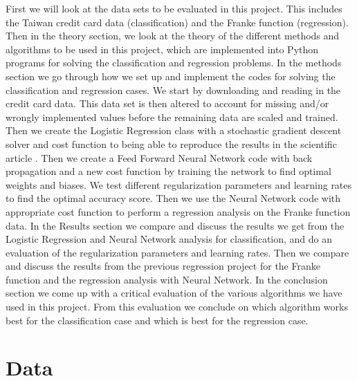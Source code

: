 \documentclass[12pt,a4paper,english]{article}
\begin{document}
First we will look at the data sets to be evaluated in this project. This includes the Taiwan credit card data (classification) and the Franke function (regression). Then in the theory section, we look at the theory of the different methods and algorithms to be used in this project, which are implemented into Python programs for solving the classification and regression problems. In the methods section we go through how we set up and implement the codes for solving the classification and regression cases. We start by downloading and reading in the credit card data. This data set is then altered to account for missing and/or wrongly implemented values before the remaining data are scaled and trained. Then we create the Logistic Regression class with a stochastic gradient descent solver and cost function to being able to reproduce the results in the scientific article \cite{origarticle}. Then we create a Feed Forward Neural Network code with back propagation and a new cost function by training the network to find optimal weights and biases. We test different regularization parameters and learning rates to find the optimal accuracy score. Then we use the Neural Network code with appropriate cost function to perform a regression analysis on the Franke function data. In the Results section we compare and discuss the results we get from the Logistic Regression and Neural Network analysis for classification, and do an evaluation of the regularization parameters and learning rates. Then we compare and discuss the results from the previous regression project for the Franke function and the regression analysis with Neural Network. In the conclusion section we come up with a critical evaluation of the various algorithms we have used in this project. From this evaluation we conclude on which algorithm works best for the classification case and which is best for the regression case.

\section{Data}
\label{sect:Data}
\end{document}
